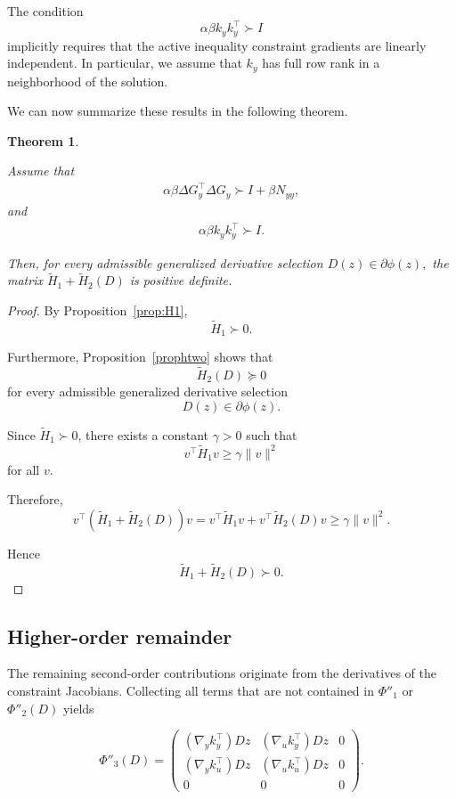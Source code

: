\documentclass[11pt]{article}
\newtheorem{theorem}{Theorem}
\begin{document}
The condition
\[
\alpha\beta k_yk_y^\top\succ I
\]
implicitly requires that the active inequality constraint gradients are
linearly independent. In particular, we assume that $k_y$ has full row
rank in a neighborhood of the solution.

We can now summarize these results in the following theorem.

\begin{theorem}
\label{thm:H1H2}

Assume that
\begin{align}
    \alpha\beta \Delta G_y^\top \Delta G_y \succ I+\beta N_{yy},
\end{align}
and
\begin{align}
    \alpha\beta k_yk_y^\top\succ I.
\end{align}

Then, for every admissible generalized derivative selection
$D(z)\in\partial\phi(z),$ the matrix $\tilde H_1+\tilde H_2(D)$ is positive definite.

\end{theorem}

\begin{proof}

By Proposition~\ref{prop:H1},
\[
\tilde H_1\succ0.
\]

Furthermore, Proposition~\ref{prophtwo} shows that
\[
\tilde H_2(D)\succeq0
\]
for every admissible generalized derivative selection
\[
D(z)\in\partial\phi(z).
\]

Since $\tilde H_1\succ0$, there exists a constant
$\gamma>0$ such that
\[
v^\top\tilde H_1v
\ge
\gamma\|v\|^2
\]
for all $v$.

Therefore,
\[
v^\top(\tilde H_1+\tilde H_2(D))v
=
v^\top\tilde H_1v
+
v^\top\tilde H_2(D)v
\ge
\gamma\|v\|^2.
\]

Hence
\[
\tilde H_1+\tilde H_2(D)\succ0.
\]


\end{proof}

\subsection{Higher-order remainder}

The remaining second-order contributions originate from the derivatives of the constraint Jacobians. Collecting all terms that are not contained in $\Phi''_{1}$ or
$\Phi''_{2}(D)$ yields

\[
\Phi''_{3}(D)
=
\begin{pmatrix}
(\nabla_y k_y^\top)Dz &
(\nabla_u k_y^\top)Dz &
0
\\[1ex]
(\nabla_y k_u^\top)Dz &
(\nabla_u k_u^\top)Dz &
0
\\[1ex]
0 & 0 & 0
\end{pmatrix}.
\]
\end{document}
